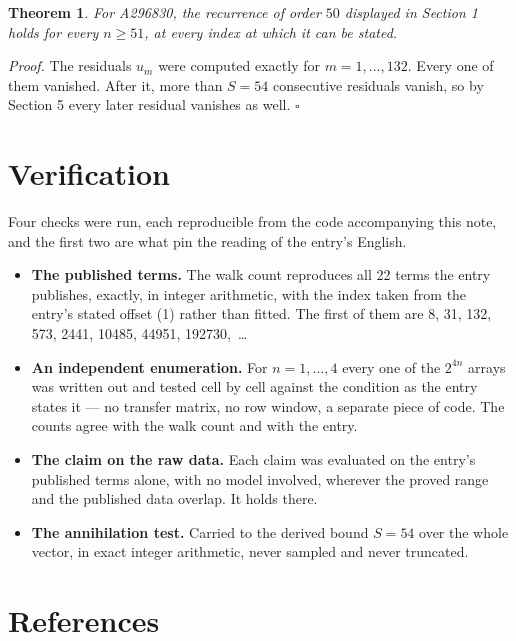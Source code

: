 \documentclass[11pt]{article}
\newtheorem{theorem}{Theorem}
\theoremstyle{definition}
\begin{document}
\begin{theorem} For A296830, the recurrence of order $50$ displayed in Section 1 holds for every $n \ge 51$, at every index at which it can be stated.\end{theorem}

{\itshape Proof.} The residuals $u_m$ were computed exactly for $m = 1,\dots,132$. Every one of them vanished. After it, more than $S = 54$ consecutive residuals vanish, so by Section 5 every later residual vanishes as well. $\square$

\section{Verification}

Four checks were run, each reproducible from the code accompanying this note, and the first two are what pin the reading of the entry's English.

\begin{itemize}

\item {\bfseries The published terms.} The walk count reproduces all 22 terms the entry publishes, exactly, in integer arithmetic, with the index taken from the entry's stated offset (1) rather than fitted. The first of them are 8, 31, 132, 573, 2441, 10485, 44951, 192730,~\dots

\item {\bfseries An independent enumeration.} For $n = 1,\dots,4$ every one of the $2^{4n}$ arrays was written out and tested cell by cell against the condition as the entry states it --- no transfer matrix, no row window, a separate piece of code. The counts agree with the walk count and with the entry.

\item {\bfseries The claim on the raw data.} Each claim was evaluated on the entry's published terms alone, with no model involved, wherever the proved range and the published data overlap. It holds there.

\item {\bfseries The annihilation test.} Carried to the derived bound $S = 54$ over the whole vector, in exact integer arithmetic, never sampled and never truncated.

\end{itemize}

\section{References}
\end{document}
